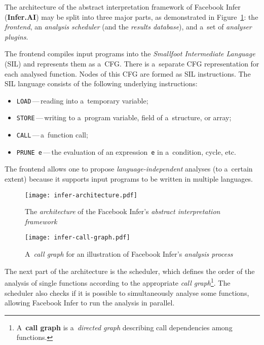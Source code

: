 The architecture of the abstract interpretation framework of Facebook Infer (\textbf{Infer.AI}) may be split into three major parts, as demonstrated in Figure~\ref{fig:inferArch}: the \emph{frontend}, an \emph{analysis scheduler} (and the \emph{results database}), and a~set of \emph{analyser plugins}.

The frontend compiles input programs into the \emph{Smallfoot Intermediate Language} (SIL) and represents them as a~CFG. There is a~separate CFG representation for each analysed function. Nodes of this CFG are formed as SIL instructions. The SIL language consists of the following underlying instructions:
\begin{itemize}
    \item \texttt{LOAD}\,---\,reading into a~temporary variable;

    \item \texttt{STORE}\,---\,writing to a~program variable, field of a~structure, or array;

    \item \texttt{CALL}\,---\,a~function call;

    \item \texttt{PRUNE~e}\,---\,the evaluation of an expression~\texttt{e} in a~condition, cycle, etc.
\end{itemize}
The frontend allows one to propose \emph{language-independent} analyses (to a~certain extent) because it supports input programs to be written in multiple languages.

\begin{figure}[hbt]
    \centering
    \texttt{[image: infer-architecture.pdf]}
    \caption{The \emph{architecture} of the Facebook Infer's \emph{abstract interpretation framework}~\cite{harmimBP}}
    \label{fig:inferArch}
\end{figure}

\begin{wrapfigure}{r}{.45 \linewidth}
    \centering
    \vspace{-1em}
    \texttt{[image: infer-call-graph.pdf]}
    \caption{A~\emph{call graph} for an illustration of Facebook Infer's \emph{analysis process}~\cite{harmimBP}}
    \vspace{-2em}
    \label{fig:inferCallGraph}
\end{wrapfigure}
The next part of the architecture is the scheduler, which defines the order of the analysis of single functions according to the appropriate \emph{call graph}\footnote{A~\textbf{call graph} is a~\emph{directed graph} describing call dependencies among functions.}. The scheduler also checks if it is possible to simultaneously analyse some functions, allowing Facebook Infer to run the analysis in parallel.


